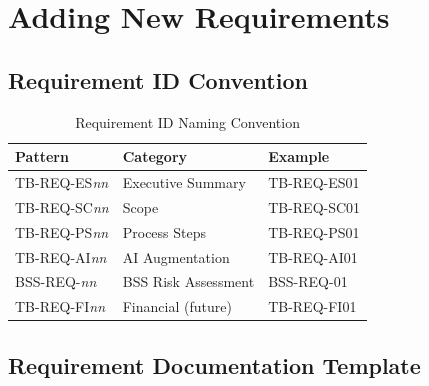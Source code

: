 \section{Adding New Requirements}
\label{sec:adding-requirements}

\subsection{Requirement ID Convention}

\begin{table}[h]
\centering
\caption{Requirement ID Naming Convention}
\begin{tabularx}{\textwidth}{@{}L{3.5cm}L{4cm}L{6cm}@{}}
\toprule
\textbf{Pattern} & \textbf{Category} & \textbf{Example} \\
\midrule
TB-REQ-ES\textit{nn} & Executive Summary & TB-REQ-ES01 \\
TB-REQ-SC\textit{nn} & Scope & TB-REQ-SC01 \\
TB-REQ-PS\textit{nn} & Process Steps & TB-REQ-PS01 \\
TB-REQ-AI\textit{nn} & AI Augmentation & TB-REQ-AI01 \\
BSS-REQ-\textit{nn} & BSS Risk Assessment & BSS-REQ-01 \\
TB-REQ-FI\textit{nn} & Financial (future) & TB-REQ-FI01 \\
\bottomrule
\end{tabularx}
\end{table}

\subsection{Requirement Documentation Template}

